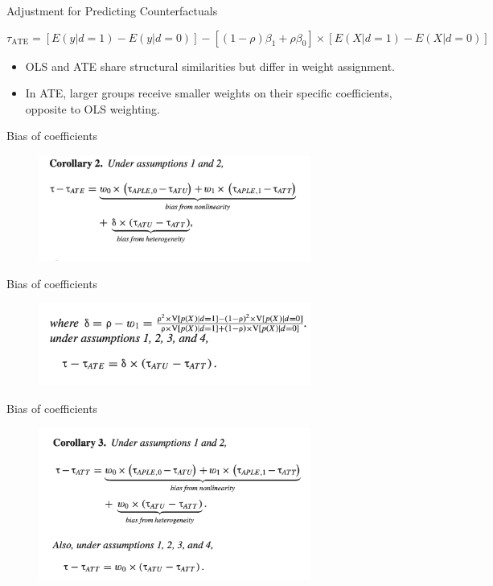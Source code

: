 \documentclass{beamer}
\begin{document}
\begin{frame}{Adjustment for Predicting Counterfactuals}

\tiny
  \[
    \tau_{\text{ATE}} = [E(y|d=1) - E(y|d=0)] - [(1 - \rho)\beta_1 + \rho\beta_0] \times [E(X | d = 1) - E(X | d = 0)]
  \]
  \begin{itemize}
    \item OLS and ATE share structural similarities but differ in weight assignment.
    \item In ATE, larger groups receive smaller weights on their specific coefficients, opposite to OLS weighting.
  \end{itemize}
\end{frame}


\begin{frame}{Bias of coefficients}
    \begin{figure}
        \centering
        \includegraphics[width=0.8\textwidth]{./lecture_includes/ols_bias1.png}
    \end{figure}
\end{frame}


\begin{frame}{Bias of coefficients}
    \begin{figure}
        \centering
        \includegraphics[width=0.8\textwidth]{./lecture_includes/ols_bias2.png}
    \end{figure}
\end{frame}

\begin{frame}{Bias of coefficients}
    \begin{figure}
        \centering
        \includegraphics[width=0.8\textwidth]{./lecture_includes/ols_bias3.png}
    \end{figure}
\end{frame}
\end{document}
